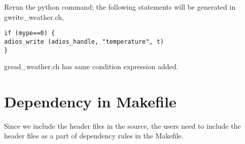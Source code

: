 Rerun the python command; the following statements will be generated in
gwrite\_weather.ch,

\begin{lstlisting}
if (mype==0) {
adios_write (adios_handle, "temperature", t)
}
\end{lstlisting}

gread\_weather.ch has same condition expression added.

\section*{Dependency in Makefile}

Since we include the header files in the source, the users need to include the 
header files as a part of dependency rules in the Makefile.